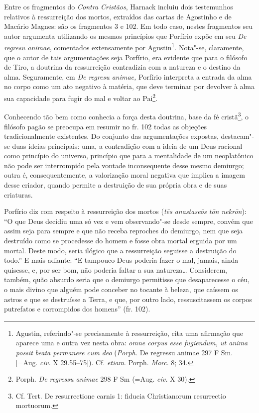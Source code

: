 Entre os fragmentos do \textit{Contra Cristãos}, Harnack incluiu dois
testemunhos relativos à ressurreição dos mortos, extraídos das cartas
de Agostinho e de Macário Magnes: são os fragmentos 3 e 102. Em todo
caso, nestes fragmentos seu autor argumenta utilizando os mesmos
princípios que Porfírio expõe em seu \textit{De regresu animae},
comentados extensamente por Agustin\footnote{ Agustin, referindo"-se
precisamente à ressurreição, cita uma afirmação que aparece uma e outra
vez nesta obra: \textit{omne corpus esse fugiendum, ut anima possit
beata permanere cum }\textit{deo} (\textit{Porph. }De regressu
animae\textit{ }297 F Sm. [=Aug. \textit{civ. }X 29.55--75]). Cf.
\textit{etiam}. Porph. \textit{Marc}. 8; 34.}. Nota"-se, claramente, que
o autor de tais argumentações seja Porfírio, era evidente que para o
filósofo de Tiro, a doutrina da ressurreição contradizia com a natureza
e o destino da alma. Seguramente, em \textit{De regresu animae,}
Porfírio interpreta a entrada da alma no corpo como um ato negativo à
matéria, que deve terminar por devolver à alma sua capacidade para
fugir do mal e voltar ao Pai\footnote{ Porph. \textit{De regressu
animae} 298 F Sm (=Aug. \textit{civ.} X 30).}.

Conhecendo tão bem como conhecia a força desta doutrina, base da fé
cristã\footnote{ Cf. Tert. De resurrectione carnis 1: fiducia
Christianorum resurrectio mortuorum.}, o filósofo pagão se preocupa em
resumir no fr. 102 todas as objeções tradicionalmente existentes. Do
conjunto das argumentações expostas, destacam"-se duas ideias
principais: uma, a contradição com a ideia de um Deus racional como
princípio do universo, princípio que para a mentalidade de um
neoplatônico não pode ser interrompido pela vontade inconsequente desse
mesmo demiurgo; outra é, consequentemente, a valorização moral negativa
que implica a imagem desse criador, quando permite a destruição de sua
própria obra e de suas criaturas.

Porfírio diz com respeito à ressurreição dos mortos
(\textit{tēs anastaseōs tōn nekrōn}): “O que Deus decidiu
uma só vez e vem observando"-se desde sempre, convém que assim seja para
sempre e que não receba reproches do demiurgo, nem que seja destruído
como se procedesse do homem e fosse obra mortal erguida por um mortal.
Deste modo, seria ilógico que a ressurreição seguisse a destruição do
todo.” E mais adiante: “E tampouco Deus poderia fazer o mal, jamais,
ainda quisesse, e, por ser bom, não poderia faltar a sua natureza…
Considerem, também, quão absurdo seria que o demiurgo permitisse que
desaparecesse o céu, o mais divino que alguém pode conceber no tocante
à beleza, que caíssem os astros e que se destruísse a Terra, e que, por
outro lado, ressuscitassem os corpos putrefatos e corrompidos dos
homens” (fr. 102).

